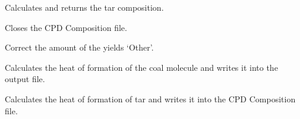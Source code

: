 \documentclass[letterpaper,10pt,english]{sphinxmanual}
\begin{document}
\begin{fulllineitems}
\begin{fulllineitems}
\end{fulllineitems}


\begin{fulllineitems}
\label{CPDClasses:Compos_and_Energy.CPD_SpeciesBalance._CPD_SpeciesBalance__TarComp}
Calculates and returns the tar composition.

\end{fulllineitems}


\begin{fulllineitems}
\label{CPDClasses:Compos_and_Energy.CPD_SpeciesBalance._CPD_SpeciesBalance__closeResultFile}
Closes the CPD Composition file.

\end{fulllineitems}


\begin{fulllineitems}
\label{CPDClasses:Compos_and_Energy.CPD_SpeciesBalance._CPD_SpeciesBalance__correctYields}
Correct the amount of the yields `Other'.

\end{fulllineitems}


\begin{fulllineitems}
\label{CPDClasses:Compos_and_Energy.CPD_SpeciesBalance._CPD_SpeciesBalance__hfRaw}
Calculates the heat of formation of the coal molecule and writes it into the output file.

\end{fulllineitems}


\begin{fulllineitems}
\label{CPDClasses:Compos_and_Energy.CPD_SpeciesBalance._CPD_SpeciesBalance__hfTar}
Calculates the heat of formation of tar and writes it into the CPD Composition file.


\end{fulllineitems}
\end{fulllineitems}
\end{document}
